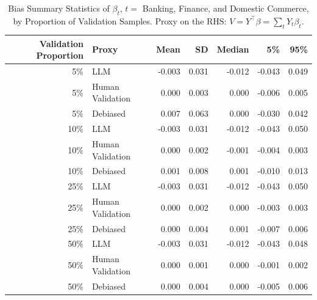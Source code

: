 \begin{table}

\caption{\label{tab:unnamed-chunk-1}Bias Summary Statistics of $\beta_{t}$, $t=$ Banking, Finance, and Domestic Commerce, by Proportion of Validation Samples.
      Proxy on the RHS: $V = Y^\top \beta = \sum_{t} Y_t \beta_t$.}
\centering
\begin{tabular}[t]{rlrrrrr}
\toprule
Validation Proportion & Proxy & Mean & SD & Median & 5\% & 95\%\\
\midrule
5\% & LLM & -0.003 & 0.031 & -0.012 & -0.043 & 0.049\\
5\% & Human Validation & 0.000 & 0.003 & 0.000 & -0.006 & 0.005\\
5\% & Debiased & 0.007 & 0.063 & 0.000 & -0.030 & 0.042\\
10\% & LLM & -0.003 & 0.031 & -0.012 & -0.043 & 0.050\\
10\% & Human Validation & 0.000 & 0.002 & -0.001 & -0.004 & 0.003\\
10\% & Debiased & 0.001 & 0.008 & 0.001 & -0.010 & 0.013\\
25\% & LLM & -0.003 & 0.031 & -0.012 & -0.043 & 0.050\\
25\% & Human Validation & 0.000 & 0.002 & 0.000 & -0.003 & 0.003\\
25\% & Debiased & 0.000 & 0.004 & 0.001 & -0.007 & 0.006\\
50\% & LLM & -0.003 & 0.031 & -0.012 & -0.043 & 0.048\\
50\% & Human Validation & 0.000 & 0.001 & 0.000 & -0.001 & 0.002\\
50\% & Debiased & 0.000 & 0.004 & 0.000 & -0.005 & 0.006\\
\bottomrule
\end{tabular}
\end{table}
